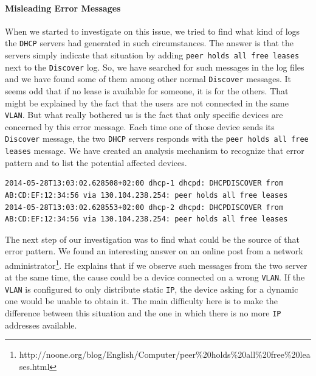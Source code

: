 \paragraph*{Misleading Error Messages} When we started to investigate on this issue, we tried to find what kind of logs the \texttt{DHCP} servers had generated in such circumstances. The answer is that the servers simply indicate that situation by adding \texttt{peer holds all free leases} next to the \texttt{Discover} log. So, we have searched for such messages in the log files and we have found some of them among other normal \texttt{Discover} messages. It seems odd that if no lease is available for someone, it is for the others. That might be explained by the fact that the users are not connected in the same \texttt{VLAN}. But what really bothered us is the fact that only specific devices are concerned by this error message. Each time one of those device sends its \texttt{Discover} message, the two \texttt{DHCP} servers responds with the \texttt{peer holds all free leases} message. We have created an analysis mechanism to recognize that error pattern and to list the potential affected devices. \\

\begin{lstlisting}[frame=single,breaklines=true,caption={Misleading Error Message}]
2014-05-28T13:03:02.628508+02:00 dhcp-1 dhcpd: DHCPDISCOVER from AB:CD:EF:12:34:56 via 130.104.238.254: peer holds all free leases
2014-05-28T13:03:02.628553+02:00 dhcp-2 dhcpd: DHCPDISCOVER from AB:CD:EF:12:34:56 via 130.104.238.254: peer holds all free leases
\end{lstlisting}


The next step of our investigation was to find what could be the source of that error pattern. We found an interesting answer on an online post from a network administrator\footnote{http://noone.org/blog/English/Computer/peer\%20holds\%20all\%20free\%20leases.html}. He explains that if we observe such messages from the two server at the same time, the cause could be a device connected on a wrong \texttt{VLAN}. If the \texttt{VLAN} is configured to only distribute static \texttt{IP}, the device asking for a dynamic one would be unable to obtain it. The main difficulty here is to make the difference between this situation and the one in which there is no more \texttt{IP} addresses available.


